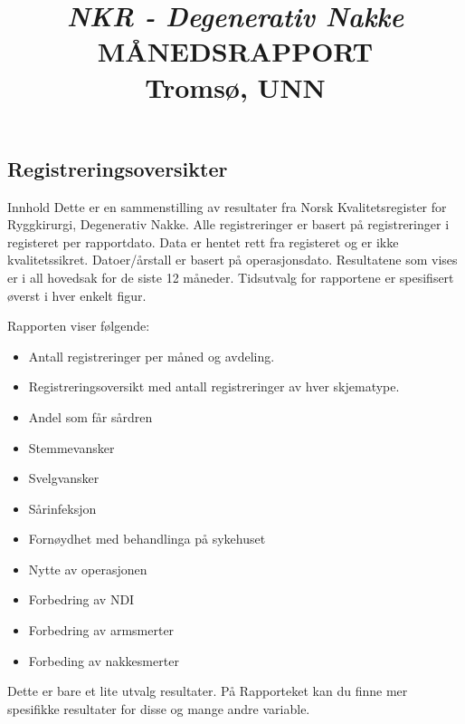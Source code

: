 \documentclass[presentation,xcolor=pdftex,dvipsnames,table]{beamer}\usepackage[]{graphicx}\usepackage[]{color}
\title[Degenerativ Nakke \\Tromsø, UNN]{\textit{NKR - Degenerativ Nakke} \\
MÅNEDSRAPPORT \\
Tromsø, UNN}
\date{}
\begin{document}
\begin{tiny}

\maketitle

\section{Registreringsoversikter}

\begin{frame}[fragile] {Innhold}
Dette er en sammenstilling av resultater  fra Norsk Kvalitetsregister for Ryggkirurgi, Degenerativ Nakke.
Alle registreringer er basert på registreringer i registeret per rapportdato. Data er hentet rett fra registeret og er ikke kvalitetssikret.
Datoer/årstall er basert på operasjonsdato. Resultatene som vises er i all hovedsak for de siste 12 måneder.
Tidsutvalg for rapportene er spesifisert øverst i hver enkelt figur.

Rapporten viser følgende:
\begin{itemize}
\item Antall registreringer per måned og avdeling.
\item	Registreringsoversikt med antall registreringer av hver skjematype.
\item Andel som får sårdren
\item	Stemmevansker
\item	Svelgvansker
\item	Sårinfeksjon
\item	Fornøydhet med behandlinga på sykehuset
\item	Nytte av operasjonen
\item Forbedring av NDI
\item Forbedring av armsmerter
\item Forbeding av nakkesmerter
\end{itemize}

Dette er bare et lite utvalg resultater. På Rapporteket kan du finne mer spesifikke resultater for disse og mange andre variable.

\end{frame}


\begin{frame}[fragile]


\end{frame}
\end{tiny}
\end{document}
